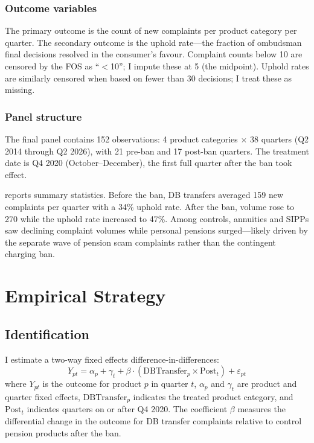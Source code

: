 \documentclass[12pt]{article}
\begin{document}
\subsubsection*{Outcome variables} The primary outcome is the count of new complaints per product category per quarter. The secondary outcome is the uphold rate---the fraction of ombudsman final decisions resolved in the consumer's favour. Complaint counts below 10 are censored by the FOS as ``$<$10''; I impute these at 5 (the midpoint). Uphold rates are similarly censored when based on fewer than 30 decisions; I treat these as missing.

\subsubsection*{Panel structure} The final panel contains 152 observations: 4 product categories $\times$ 38 quarters (Q2 2014 through Q2 2026), with 21 pre-ban and 17 post-ban quarters. The treatment date is Q4 2020 (October--December), the first full quarter after the ban took effect.



 reports summary statistics. Before the ban, DB transfers averaged 159 new complaints per quarter with a 34\% uphold rate. After the ban, volume rose to 270 while the uphold rate increased to 47\%. Among controls, annuities and SIPPs saw declining complaint volumes while personal pensions surged---likely driven by the separate wave of pension scam complaints rather than the contingent charging ban.


\section{Empirical Strategy}

\subsection{Identification}

I estimate a two-way fixed effects difference-in-differences:
\begin{equation}
Y_{pt} = \alpha_p + \gamma_t + \beta \cdot (\text{DBTransfer}_p \times \text{Post}_t) + \varepsilon_{pt}
\label{eq:did}
\end{equation}
where $Y_{pt}$ is the outcome for product $p$ in quarter $t$, $\alpha_p$ and $\gamma_t$ are product and quarter fixed effects, $\text{DBTransfer}_p$ indicates the treated product category, and $\text{Post}_t$ indicates quarters on or after Q4 2020. The coefficient $\beta$ measures the differential change in the outcome for DB transfer complaints relative to control pension products after the ban.
\end{document}
